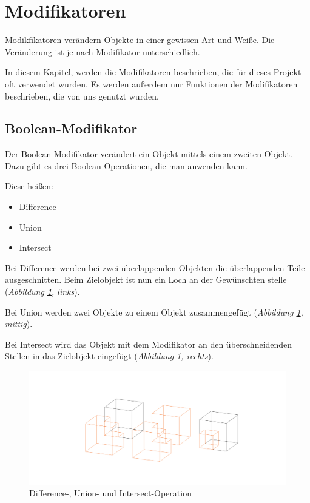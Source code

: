 \section{Modifikatoren}
Modikfikatoren verändern Objekte in einer gewissen Art und Weiße. Die Veränderung ist je nach Modifikator unterschiedlich.

In diesem Kapitel, werden die Modifikatoren beschrieben, die für dieses Projekt oft verwendet wurden.
Es werden außerdem nur Funktionen der Modifikatoren beschrieben, die von uns genutzt wurden.

\subsection{Boolean-Modifikator\citep{blender:boolean_modifier}}
\label{Boolean:heading}
Der Boolean-Modifikator verändert ein Objekt mittels einem zweiten Objekt. Dazu gibt es
drei Boolean-Operationen, die man anwenden kann.

Diese heißen:
\begin{itemize}
    \item  Difference
    \item  Union
    \item  Intersect
\end{itemize}

Bei Difference werden bei zwei überlappenden Objekten die überlappenden Teile ausgeschnitten. Beim Zielobjekt ist nun ein Loch an der Gewünschten stelle (\textit{Abbildung \ref{modifikatoren:image1}, links}).

Bei Union werden zwei Objekte zu einem Objekt zusammengefügt (\textit{Abbildung \ref{modifikatoren:image1}, mittig}).

Bei Intersect wird das Objekt mit dem Modifikator an den überschneidenden Stellen in das Zielobjekt eingefügt (\textit{Abbildung \ref{modifikatoren:image1}, rechts}).

\begin{figure}[h]
    \centering
    \includegraphics[width=.8\textwidth]{images/Modifikatoren-Boolean.png}
    \caption{Difference-, Union- und Intersect-Operation}
    \label{modifikatoren:image1}
\end{figure}

